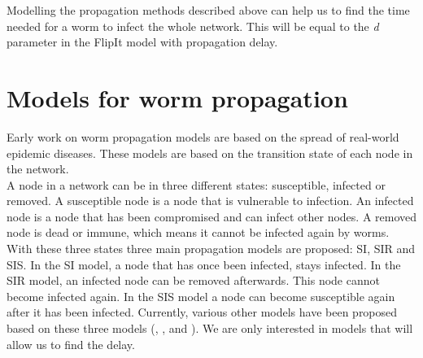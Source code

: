 \begin{description}
\end{description}

 Modelling the propagation methods described above can help us to find the time needed for a worm to infect the whole network. This will be equal to the \textit{d} parameter in the FlipIt model with propagation delay. \\

\section{Models for worm propagation}
\label{modelsforpropagation}
Early work on worm propagation models are based on the spread of real-world epidemic diseases. These models are based on the transition state of each node in the network.\\
A node in a network can be in three different states: susceptible, infected or removed. A susceptible node is a node that is vulnerable to infection. An infected node is a node that has been compromised and can infect other nodes. A removed node is dead or immune, which means it cannot be infected again by worms. With these three states three main propagation models are proposed: SI, SIR and SIS. In the SI model, a node that has once been infected, stays infected. In the SIR model, an infected node can be removed afterwards. This node cannot become infected again. In the SIS model a node can become susceptible again after it has been infected. Currently, various other models have been proposed based on these three models (\cite{wang2014modeling}, \cite{OnWorms2005survey}, \cite{xiang2009propagation} and \cite{serazzi2004computer}). We are only interested in models that will allow us to find the delay. \\

